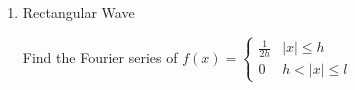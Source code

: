 \begin{enumerate}
\begin{align*}
              a_1
               & =0,\quad n=1                                                                                                                                                                           \\
              b_n
               & =\frac{\omega}{\pi}\int_{-\frac{\pi}{\omega}}^{\frac{\pi}{\omega}}f(t)\sin\left(n\omega t\right)\,\mathrm{d}t                                                                          \\
               & =\frac{\omega}{\pi}\int_0^{\frac{\pi}{\omega}}E\sin\omega t\sin(n\omega t)\,\mathrm{d}t                                                                                                \\
               & =\frac{\omega E}{2\pi}\int_{0}^{\frac{\pi}{\omega}}\left[\cos\left((1+n)\omega t\right)+\cos\left((1-n)\omega t\right)\right]\,\mathrm{d}t                                             \\
               & =\begin{cases}
                      \frac{2 E\omega}{\pi}\left.\left(\frac{\sin(n+1)\omega t}{(n+1)\omega}+\frac{\sin(1-n)\omega t}{(1-n)\omega}\right)\right|_0^{\frac{\pi}{0}}=0 & n\neq 1 \\
                      \frac{E}{2}                                                                                                                                    & n=1
                  \end{cases}
          \end{align*}

          $[-l,l]$, $a_n=\frac{1}{l}\int_{-l}^l f(x)\cos\frac{n\pi}{l}x\,\mathrm{d}x$

          The Fourier Series of $f(t)$ is
          $$\underset{\text{\allbold{direct current}}}{\frac{E}{\pi}}+\frac{E}{2}\underset{\text{\allbold{fundamental waveform}}}{\sin\omega t}+\sum_{n=1}^{\infty}\underset{\text{\allbold{$n$-th harmonic}}}{\frac{E}{\pi}\frac{(-1)^{n-1}-1}{n^2-1}\underset{\boldsymbol{\sin n\omega t}}{\cos n\omega t}}$$
          It converges to $f(t)$ pointwisely.
    \item Rectangular Wave

          Find the Fourier series of $f(x)=\begin{cases}
                  \frac{1}{2h} & |x|\leq h   \\
                  0            & h<|x|\leq l
              \end{cases}$


\end{enumerate}
